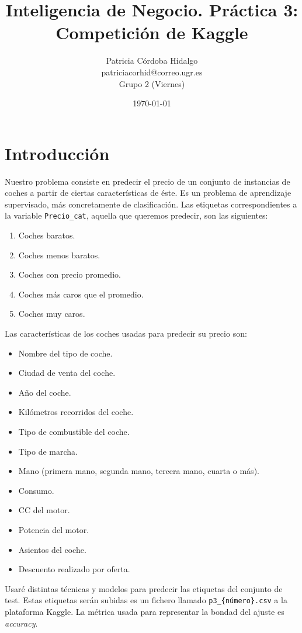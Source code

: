 \documentclass[a4]{article}
\title{\Huge Inteligencia de Negocio. Práctica 3:\\
Competición de Kaggle \vspace{5mm}}
\author{\LARGE Patricia Córdoba Hidalgo \vspace{2mm}\\
  \Large patriciacorhid@correo.ugr.es \vspace{2mm}\\
  \Large Grupo 2 (Viernes) \vspace{5mm}}
\date{\today}
\begin{document}
\maketitle

\newpage
\tableofcontents
\newpage

\section{Introducción}

Nuestro problema consiste en predecir el precio de un conjunto de instancias de coches a partir de ciertas características de éste. Es un problema de aprendizaje supervisado, más concretamente de clasificación. Las etiquetas correspondientes a la variable \texttt{Precio\_cat}, aquella que queremos predecir, son las siguientes:

\begin{enumerate}
\item Coches baratos.
\item Coches menos baratos.
\item Coches con precio promedio.
\item Coches más caros que el promedio.
\item Coches muy caros.
\end{enumerate}

Las características de los coches usadas para predecir su precio son:

\begin{itemize}
\item Nombre del tipo de coche.
\item Ciudad de venta del coche.
\item Año del coche.
\item Kilómetros recorridos del coche.
\item Tipo de combustible del coche.
\item Tipo de marcha.
\item Mano (primera mano, segunda mano, tercera mano, cuarta o más).
\item Consumo.
\item CC del motor.
\item Potencia del motor.
\item Asientos del coche.
\item Descuento realizado por oferta.
\end{itemize}

Usaré distintas técnicas y modelos para predecir las etiquetas del conjunto de test. Estas etiquetas serán subidas es un fichero llamado \texttt{p3\_\{número\}.csv} a la plataforma Kaggle. La métrica usada para representar la bondad del ajuste es \textit{accuracy}.
\end{document}
